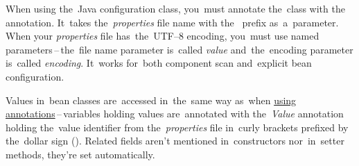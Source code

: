 When using the~Java configuration class, you~must annotate the~class with the~ annotation.
It~takes the~\textit{properties} file name with the~ prefix as~a~parameter.
When your \textit{properties} file has~the~UTF--8 encoding, you~must use named parameters\,--\,the~file name parameter is~called \textit{value} and~the~encoding parameter is~called \textit{encoding}.
It~works for~both component scan and~explicit bean configuration.

Values in~bean classes are~accessed in~the~same way as~when \hyperref[readingpropertiesannotations]{using annotations}\,--\,variables holding values are~annotated with the~\textit{Value} annotation holding the~value identifier from the~\textit{properties} file in~curly brackets prefixed by the~dollar sign ().
Related fields aren't mentioned in~constructors nor~in~setter methods, they're set automatically.

